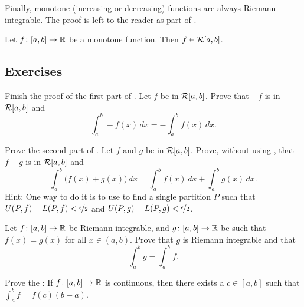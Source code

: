 Finally, monotone (increasing or decreasing) functions are always
Riemann integrable.  The proof is left to the reader as part of
.

\begin{prop} \label{prop:monotoneintegrable}
Let $f \colon [a,b] \to {\mathbb{R}}$ be a monotone function.  Then $f \in {\mathcal{R}}[a,b]$.
\end{prop}

\subsection{Exercises}

\begin{exercise} \label{exercise:proofoflinpropparti}
Finish the proof of the first part of .
Let $f$ be in ${\mathcal{R}}[a,b]$.  Prove that
$-f$ is in ${\mathcal{R}}[a,b]$ and 
\begin{equation*}
\int_a^b - f(x) \,dx = - \int_a^b f(x) \,dx .
\end{equation*}
\end{exercise}

\begin{exercise} \label{exercise:proofoflinproppartii}
Prove the second part of .
Let $f$ and $g$ be in ${\mathcal{R}}[a,b]$.
Prove, without using , that $f+g$ is in ${\mathcal{R}}[a,b]$ and
\begin{equation*}
\int_a^b \bigl( f(x)+g(x) \bigr) \,dx = 
\int_a^b f(x) \,dx 
+
\int_a^b g(x) \,dx .
\end{equation*}
Hint: One way to do it is to use  to find a single partition $P$
such that $U(P,f)-L(P,f) < \nicefrac{\epsilon}{2}$ and
$U(P,g)-L(P,g) < \nicefrac{\epsilon}{2}$.
\end{exercise}

\begin{exercise} \label{exercise:changeendpointsintegral}
Let $f \colon [a,b] \to {\mathbb{R}}$ be Riemann integrable, and $g \colon [a,b] \to {\mathbb{R}}$
be such that $f(x) = g(x)$ for all $x \in (a,b)$.
Prove that $g$ is Riemann integrable and that
\begin{equation*}
\int_a^b g = \int_a^b f.
\end{equation*}
\end{exercise}

\begin{exercise}
Prove the \emph{}:
If $f \colon [a,b] \to {\mathbb{R}}$ is continuous, then there exists
a $c \in [a,b]$ such that $\int_a^b f = f(c)(b-a)$.
\end{exercise}

